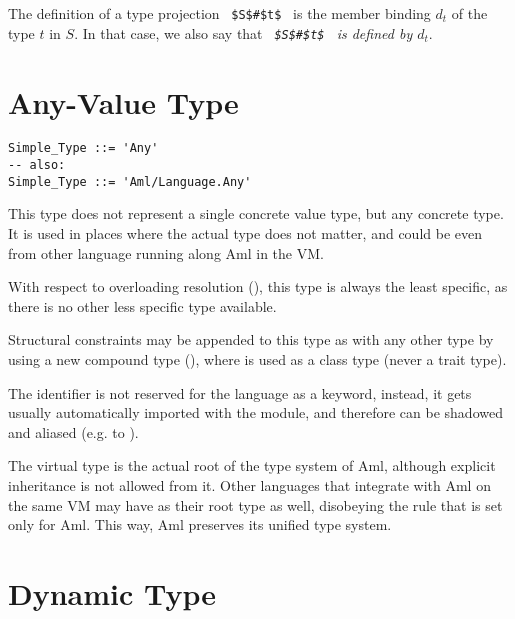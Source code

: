 \begin{enumerate}
  The definition of a type projection ~\lstinline!$S$#$t$!~ is the member binding $d_t$ of the type $t$ in $S$. In that case, we also say that {\em ~\lstinline!$S$#$t$!~ is defined by $d_t$}. 

\end{enumerate}







\section{Any-Value Type}
\label{sec:any-value-type}

\grammar\begin{lstlisting}[morekeywords={Any},deletekeywords={also}]
Simple_Type ::= 'Any'
-- also:
Simple_Type ::= 'Aml/Language.Any'
\end{lstlisting}

This type does not represent a single concrete value type, but any concrete type. It is used in places where the actual type does not matter, and could be even from other language running along Aml in the VM. 

With respect to overloading resolution (), this type is always the least specific, as there is no other less specific type available. 

Structural constraints may be appended to this type as with any other type by using a new compound type (), where  is used as a class type (never a trait type).

The  identifier is not reserved for the language as a keyword, instead, it gets usually automatically imported with the  module, and therefore can be shadowed and aliased (e.g. to ). 

The  virtual type is the actual root of the type system of Aml, although explicit inheritance is not allowed from it. Other languages that integrate with Aml on the same VM may have  as their root type as well, disobeying the rule that is set only for Aml. This way, Aml preserves its unified type system. 





\section{Dynamic Type}
\label{sec:dynamic-type}

